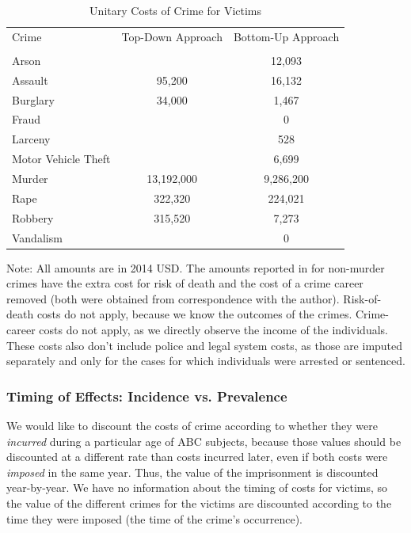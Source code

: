 \begin{table}[H]
\begin{threeparttable}
\caption{Unitary Costs of Crime for Victims} \label{tab:individual-crime-cost}
\begin{tabular}{lcc}
\toprule
Crime				&Top-Down Approach	&Bottom-Up Approach	\\
					& \cite{Cohen_Rust_etal_2004_Criminology}&\cite{McCollister_etal_2010_DAD}\\ \midrule
Arson				&					&12,093			\\
Assault				&95,200			&16,132 			\\
Burglary			&34,000			&1,467 			\\		
Fraud				&				&0				\\
Larceny				&				&528 				\\
Motor Vehicle Theft	&				&6,699 			\\
Murder				&13,192,000		&9,286,200 		\\
Rape				&322,320			&224,021 			\\
Robbery				&315,520			&7,273 			\\
Vandalism			&					&0				\\ \bottomrule
\end{tabular}
\begin{tablenotes}
\item Note: All amounts are in 2014 USD. The amounts reported in \cite{McCollister_etal_2010_DAD} for non-murder crimes have the extra cost for risk of death and the cost of a crime career removed (both were obtained from correspondence with the author). Risk-of-death costs do not apply, because we know the outcomes of the crimes. Crime-career costs do not apply, as we directly observe the income of the individuals. These costs also don't include police and legal system costs, as those are imputed separately and only for the cases for which individuals were arrested or sentenced.
\end{tablenotes}
\end{threeparttable}
\end{table}

\subsubsection{Timing of Effects: Incidence vs. Prevalence}
\noindent We would like to discount the costs of crime according to whether they were \textit{incurred} during a particular age of ABC subjects, because those values should be discounted at a different rate than costs incurred later, even if both costs were \textit{imposed} in the same year. Thus, the value of the imprisonment is discounted year-by-year. We have no information about the timing of costs for victims, so the value of the different crimes for the victims are discounted according to the time they were imposed (the time of the crime's occurrence). \\

